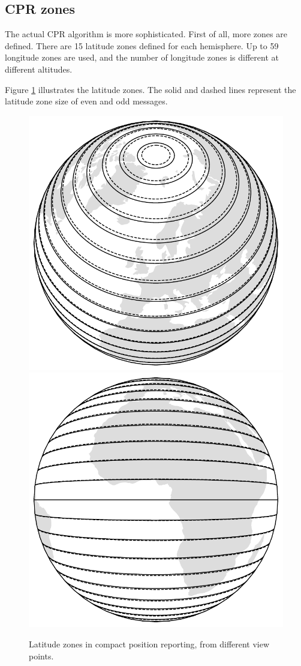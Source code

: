 \subsection{CPR zones}
The actual CPR algorithm is more sophisticated. First of all, more zones are defined. There are 15 latitude zones defined for each hemisphere. Up to 59 longitude zones are used, and the number of longitude zones is different at different altitudes.

Figure \ref{fig:cpr_lat_zones} illustrates the latitude zones. The solid and dashed lines represent the latitude zone size of even and odd messages.

\begin{figure}
  \includegraphics[width=0.7\linewidth]{figures/adsb/cpr_lat_zone_high.pdf} 
  \\
  \vspace{0.5cm}
  \includegraphics[width=0.7\linewidth]{figures/adsb/cpr_lat_zone_low.pdf}
  \caption{Latitude zones in compact position reporting, from different view points.}
  \label{fig:cpr_lat_zones}
\end{figure}

